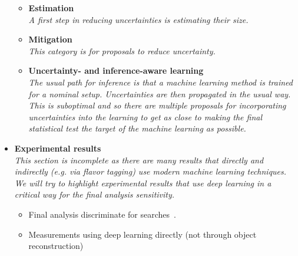 \documentclass[12pt,letterpaper]{article}
\begin{document}
\begin{itemize}
\begin{itemize}
		\item \textbf{Estimation}~\cite{Nachman:2019dol,Nachman:2019yfl,Barnard:2016qma,Bellagente:2021yyh}
		\\\textit{A first step in reducing uncertainties is estimating their size.}
		\item \textbf{Mitigation}~\cite{Estrade:DLPS2017,Englert:2018cfo,Louppe:2016ylz,Araz:2021wqm}
		\\\textit{This category is for proposals to reduce uncertainty.}
		\item \textbf{Uncertainty- and inference-aware learning}~\cite{Caron:2019xkx,Bollweg:2019skg,deCastro:2018mgh,Wunsch:2020iuh,Ghosh:2021roe,Abudinen:2021qpc}
		\\\textit{The usual path for inference is that a machine learning method is trained for a nominal setup.  Uncertainties are then propagated in the usual way.  This is suboptimal and so there  are multiple proposals for incorporating uncertainties into the learning to get as close to making the final statistical test the target of the machine learning as possible.}
	\end{itemize}
\item \textbf{Experimental results}
\\\textit{This section is incomplete as there are many results that directly and indirectly (e.g. via flavor tagging) use modern machine learning techniques.  We will try to highlight experimental results that use deep learning in a critical way for the final analysis sensitivity.}
	\begin{itemize}
		\item Final analysis discriminate for searches~\cite{Aad:2019yxi,Aad:2020hzm,collaboration2020dijet,Sirunyan:2020hwz}.
		\item Measurements using deep learning directly (not through object reconstruction)~\cite{H1:2021wkz}
	\end{itemize}


\end{itemize}


\clearpage
\flushbottom
%


\end{document}
